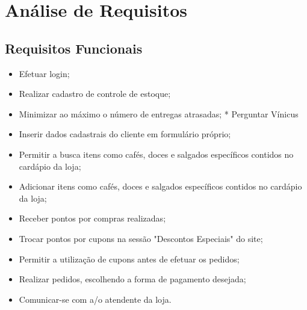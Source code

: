 
\chapter{Análise de Requisitos}

\section{Requisitos Funcionais}
\begin{itemize}
	\item Efetuar login;
	\item Realizar cadastro de controle de estoque;
	\item Minimizar ao máximo o número de entregas atrasadas; * Perguntar Vínicus
	\item Inserir dados cadastrais do cliente em formulário próprio;
	\item Permitir a busca itens como cafés, doces e salgados específicos contidos no cardápio da loja;
	\item Adicionar itens como cafés, doces e salgados específicos contidos no cardápio da loja;
	\item Receber pontos por compras realizadas;
	\item Trocar pontos por cupons na sessão "Descontos Especiais" do site;
	\item Permitir a utilização de cupons antes de efetuar os pedidos;
	\item Realizar pedidos, escolhendo a forma de pagamento desejada;
	\item Comunicar-se com a/o atendente da loja.
\end{itemize}

